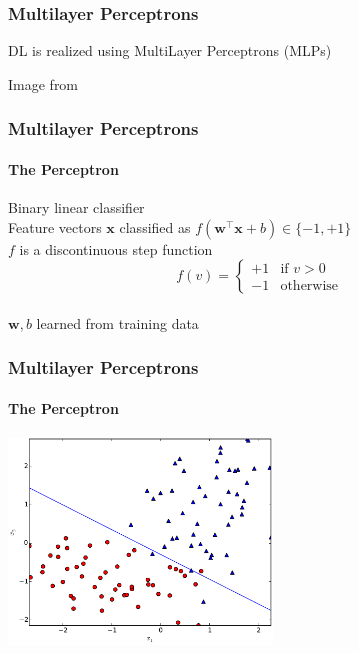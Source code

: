 \documentclass[xetex,professionalfont]{beamer}
\renewcommand{\vec}[1]{\ensuremath{\mathbf{#1}}}
\newcommand{\vw}{\vec{w}}
\newcommand{\vx}{\vec{x}}
\begin{document}

\begin{frame}
\frametitle{Multilayer Perceptrons}

DL is realized using MultiLayer Perceptrons (MLPs) %

\bigskip
\begin{center}
	{\centering Image from \cite{bishop2006}}
\end{center}

\end{frame}


\begin{frame}
\frametitle{Multilayer Perceptrons}
\framesubtitle{The Perceptron}

Binary linear classifier\\\medskip
Feature vectors $\vx$ classified as $f(\vw^\top\vx+b)\in\{-1,+1\}$\\\medskip %
$f$ is a discontinuous step function %
\[
f(v)=\begin{cases}
	+1 & \text{if } v>0\\
	-1 & \text{otherwise}
\end{cases}
\]\\\medskip
$\vw,b$ learned from training data %

\end{frame}


\begin{frame}
\frametitle{Multilayer Perceptrons}
\framesubtitle{The Perceptron}

\begin{center}
	\includegraphics[width=7cm]{figures/perceptron-classification.pdf} %
\end{center}

\end{frame}
\end{document}
